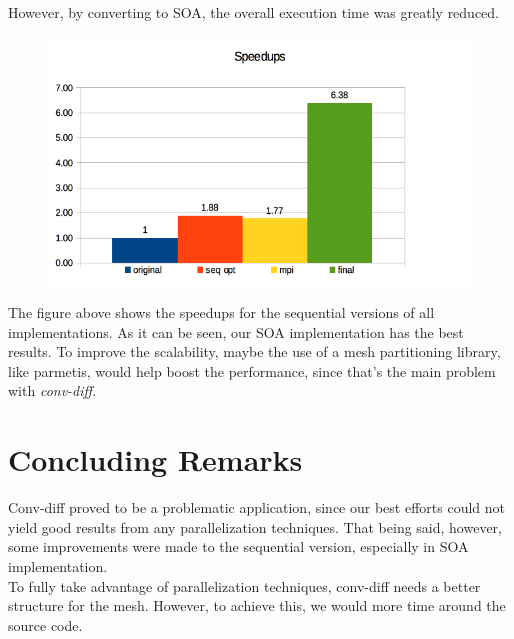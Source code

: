 \documentclass[a4paper,10pt,openright,openbib,twocolumn]{article}
\begin{document}
    However, by converting to SOA, the overall execution time was greatly reduced.

    \begin{figure}[H]
        \centering   
        \includegraphics[width=\columnwidth]{../images/time_compared.png}        
    \end{figure}

    The figure above shows the speedups for the sequential versions of all implementations. As it can be seen, our SOA implementation has the best results. To improve the scalability, maybe the use of a mesh partitioning library, like parmetis, would help boost the performance, since that's the main problem with \emph{conv-diff}.


\section{Concluding Remarks}
\label{conc}

Conv-diff proved to be a problematic application, since our best efforts could not yield good results from any parallelization techniques. That being said, however, some improvements were made to the sequential version, especially in SOA implementation. \\
To fully take advantage of parallelization techniques, conv-diff needs a better structure for the mesh. However, to achieve this, we would more time around the source code. \\
\end{document}
